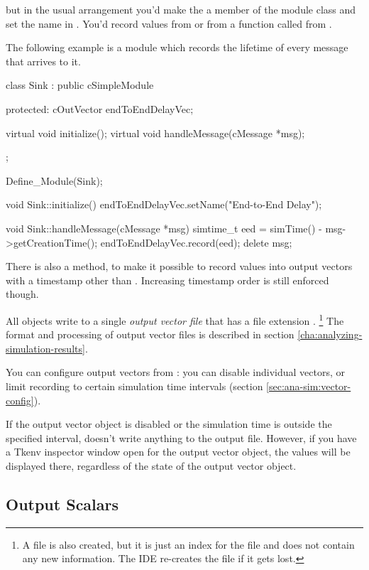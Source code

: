 but in the usual arrangement you'd make the  a member
of the module class and set the name in . You'd
record values from  or from a function called from
.

The following example is a  module which records the lifetime
of every message that arrives to it.

\begin{cpp}
class Sink : public cSimpleModule
{
  protected:
    cOutVector endToEndDelayVec;

    virtual void initialize();
    virtual void handleMessage(cMessage *msg);
};

Define_Module(Sink);

void Sink::initialize()
{
    endToEndDelayVec.setName("End-to-End Delay");
}

void Sink::handleMessage(cMessage *msg)
{
    simtime_t eed = simTime() - msg->getCreationTime();
    endToEndDelayVec.record(eed);
    delete msg;
}
\end{cpp}

There is also a  method, to make it
possible to record values into output vectors with a timestamp other than
. Increasing timestamp order is still enforced though.

All  objects write to a single \textit{output vector file}
that has a file extension .
  \footnote{A  file is also created, but it is just an index for
  the  file and does not contain any new information. The IDE
  re-creates the  file if it gets lost.}
The format and processing of output vector files is described in section
\ref{cha:analyzing-simulation-results}.

You can configure output vectors from :
you can disable individual vectors, or limit recording to certain
simulation time intervals (section \ref{sec:ana-sim:vector-config}).

If the output vector object is disabled or the simulation time is
outside the specified interval,  doesn't write
anything to the output file. However, if you have a Tkenv inspector
window open for the output vector object,
the values will be displayed there, regardless of the state of the
output vector object.



\subsection{Output Scalars}

